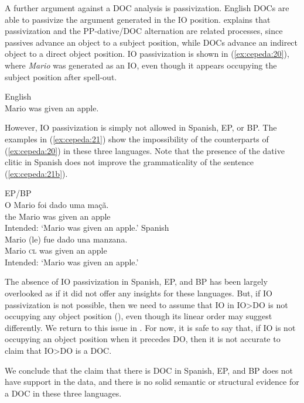\documentclass[output=paper,colorlinks,citecolor=brown,nonflat]{./langscibook}
\begin{document}
A further argument against a DOC analysis is passivization. English DOCs are able to passivize the argument generated in the IO position. \citet{Larson1988} explains that passivization and the PP-dative/DOC alternation are related processes, since passives advance an object to a subject position, while DOCs advance an indirect object to a direct object position. IO passivization is shown in (\ref{ex:cepeda:20}), where \textit{Mario} was generated as an IO, even though it appears occupying the subject position after spell-out.

\ea%
    \label{ex:cepeda:20} 
    English\\
	Mario was given an apple.
\z

However, IO passivization is simply not allowed in Spanish, EP, or BP. The examples in (\ref{ex:cepeda:21}) show the impossibility of the counterparts of (\ref{ex:cepeda:20}) in these three languages. Note that the presence of the dative clitic in Spanish does not improve the grammaticality of the sentence (\ref{ex:cepeda:21b}).

\ea%
    \label{ex:cepeda:21}
	\ea\label{ex:cepeda:21a}
	EP/BP\\
	\gll *O Mario  foi   dado uma maçã.\\
		the Mario was given an    apple\\
	\glt Intended: ‘Mario was given an apple.’
	\ex\label{ex:cepeda:21b}
	Spanish\\
	\gll  *Mario (le) fue dado  una manzana.\\
		Mario \textsc{cl} was given an apple\\
	\glt Intended: ‘Mario was given an apple.’
	\z
\z

The absence of IO passivization in Spanish, EP, and BP has been largely overlooked as if it did not offer any insights for these languages. But, if IO passivization is not possible, then we need to assume that IO in IO>DO is not occupying any object position (\citealt{Larson2014}), even though its linear order may suggest differently. We return to this issue in . For now, it is safe to say that, if IO is not occupying an object position when it precedes DO, then it is not accurate to claim that IO>DO is a DOC.

We conclude that the claim that there is DOC in Spanish, EP, and BP does not have support in the data, and there is no solid semantic or structural evidence for a DOC in these three languages. 
\end{document}
